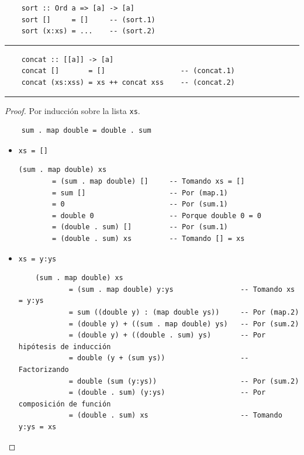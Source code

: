 \documentclass[11pt,letterpaper]{article}
\begin{document}
\begin{enumerate}
\begin{verbatim}
    sort :: Ord a => [a] -> [a]
    sort []     = []     -- (sort.1)
    sort (x:xs) = ...    -- (sort.2)
\end{verbatim}

\noindent
{\color{WildStrawberry} \rule{\linewidth}{0.4mm} }

\begin{verbatim}
    concat :: [[a]] -> [a]
    concat []       = []                  -- (concat.1)
    concat (xs:xss) = xs ++ concat xss    -- (concat.2)
\end{verbatim}

\noindent
{\color{WildStrawberry} \rule{\linewidth}{0.4mm} }


\begin{proof} Por inducción sobre la lista \texttt{xs}.
\hfill
\begin{verbatim}
    sum . map double = double . sum
\end{verbatim}

\begin{itemize}
\item \texttt{xs = []}

\begin{verbatim}
(sum . map double) xs
        = (sum . map double) []     -- Tomando xs = []
        = sum []                    -- Por (map.1)
        = 0                         -- Por (sum.1)
        = double 0                  -- Porque double 0 = 0
        = (double . sum) []         -- Por (sum.1)
        = (double . sum) xs         -- Tomando [] = xs
\end{verbatim}

\item \texttt{xs = y:ys}
\begin{verbatim}
    (sum . map double) xs
            = (sum . map double) y:ys                -- Tomando xs = y:ys
            = sum ((double y) : (map double ys))     -- Por (map.2)
            = (double y) + ((sum . map double) ys)   -- Por (sum.2)
            = (double y) + ((double . sum) ys)       -- Por hipótesis de inducción
            = double (y + (sum ys))                  -- Factorizando
            = double (sum (y:ys))                    -- Por (sum.2)
            = (double . sum) (y:ys)                  -- Por composición de función
            = (double . sum) xs                      -- Tomando y:ys = xs
\end{verbatim}
\end{itemize}
\end{proof}


\end{enumerate}
\end{document}
